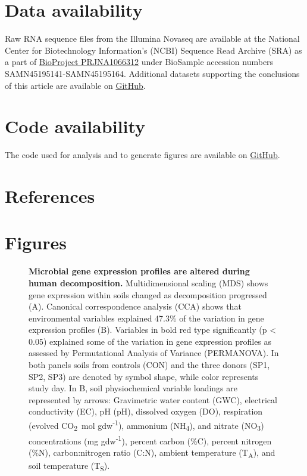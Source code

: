 \documentclass[
  sn-nature,
  lineno, referee]{sn-jnl}
\begin{document}
\section{Data availability}\label{data-availability}

Raw RNA sequence files from the Illumina Novaseq are available at the
National Center for Biotechnology Information's (NCBI) Sequence Read
Archive (SRA) as a part of
\href{https://www.ncbi.nlm.nih.gov/bioproject/PRJNA1066312/}{BioProject
PRJNA1066312} under BioSample accession numbers
SAMN45195141-SAMN45195164. Additional datasets supporting the
conclusions of this article are available on
\href{https://github.com/amason30/Mason_MetaT_XXX_2024}{GitHub}.

\section{Code availability}\label{code-availability}

The code used for analysis and to generate figures are available on
\href{https://github.com/amason30/Mason_MetaT_XXX_2024}{GitHub}.

\section{References}\label{references}

\renewcommand{\bibsection}{}


\newpage

\section{Figures}\label{figures}

\begin{figure}[!h]
\caption{{\bf Microbial gene expression profiles are altered during human decomposition.}
Multidimensional scaling (MDS) shows gene expression within soils changed as decomposition progressed (A). Canonical correspondence analysis (CCA) shows that environmental variables explained 47.3\% of the variation in gene expression profiles (B). Variables in bold red type significantly (p < 0.05) explained some of the variation in gene expression profiles as assessed by Permutational Analysis of Variance (PERMANOVA). In both panels soils from controls (CON) and the three donors (SP1, SP2, SP3) are denoted by symbol shape, while color represents study day. In B, soil physiochemical variable loadings are represented by arrows: Gravimetric water content (GWC), electrical conductivity (EC), pH (pH), dissolved oxygen (DO), respiration (evolved CO\textsubscript{2}\ \textmu mol gdw\textsuperscript{-1}), ammonium (NH\textsubscript{4}), and nitrate (NO\textsubscript{3}) concentrations (mg gdw\textsuperscript{-1}), percent carbon (\%C), percent nitrogen (\%N), carbon:nitrogen ratio (C:N), ambient temperature (T\textsubscript{A}), and soil temperature (T\textsubscript{S}).}
\label{fig-mds}
\end{figure}
\end{document}

